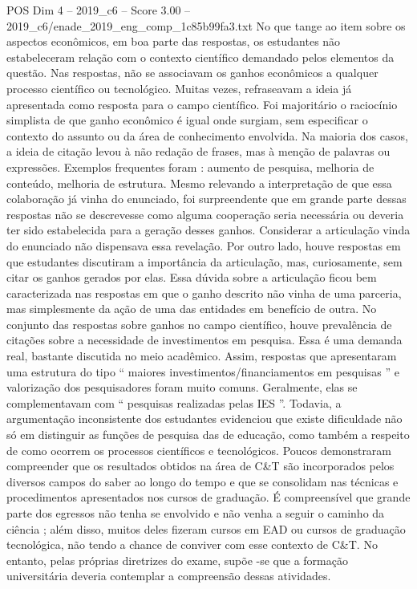 \begin{textsample}{POS Dim 4 – 2019\_c6 – Score 3.00 – 2019\_c6/enade\_2019\_eng\_comp\_1c85b99fa3.txt}
No que tange ao item sobre os aspectos econômicos, em boa parte das respostas, os estudantes não estabeleceram relação com o contexto científico demandado pelos elementos da questão.
Nas respostas, não se associavam os ganhos econômicos a qualquer processo científico ou tecnológico.
Muitas vezes, refraseavam a ideia já apresentada como resposta para o campo científico.
Foi majoritário o raciocínio simplista de que ganho econômico é igual onde surgiam, sem especificar o contexto do assunto ou da área de conhecimento envolvida.
Na maioria dos casos, a ideia de citação levou à não redação de frases, mas à menção de palavras ou expressões.
Exemplos frequentes foram : aumento de pesquisa, melhoria de conteúdo, melhoria de estrutura.
Mesmo relevando a interpretação de que essa colaboração já vinha do enunciado, foi surpreendente que em grande parte dessas respostas não se descrevesse como alguma cooperação seria necessária ou deveria ter sido estabelecida para a geração desses ganhos.
Considerar a articulação vinda do enunciado não dispensava essa revelação.
Por outro lado, houve respostas em que estudantes discutiram a importância da articulação, mas, curiosamente, sem citar os ganhos gerados por elas.
Essa dúvida sobre a articulação ficou bem caracterizada nas respostas em que o ganho descrito não vinha de uma parceria, mas simplesmente da ação de uma das entidades em benefício de outra.
No conjunto das respostas sobre ganhos no campo científico, houve prevalência de citações sobre a necessidade de investimentos em pesquisa.
Essa é uma demanda real, bastante discutida no meio acadêmico.
Assim, respostas que apresentaram uma estrutura do tipo “ maiores investimentos/financiamentos em pesquisas ” e valorização dos pesquisadores foram muito comuns.
Geralmente, elas se complementavam com “ pesquisas realizadas pelas IES ”.
Todavia, a argumentação inconsistente dos estudantes evidenciou que existe dificuldade não só em distinguir as funções de pesquisa das de educação, como também a respeito de como ocorrem os processos científicos e tecnológicos.
Poucos demonstraram compreender que os resultados obtidos na área de C\&T são incorporados pelos diversos campos do saber ao longo do tempo e que se consolidam nas técnicas e procedimentos apresentados nos cursos de graduação.
É compreensível que grande parte dos egressos não tenha se envolvido e não venha a seguir o caminho da ciência ; além disso, muitos deles fizeram cursos em EAD ou cursos de graduação tecnológica, não tendo a chance de conviver com esse contexto de C\&T.
No entanto, pelas próprias diretrizes do exame, supõe -se que a formação universitária deveria contemplar a compreensão dessas atividades.

\end{textsample}
